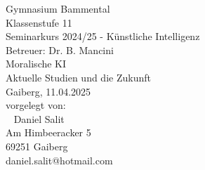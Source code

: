 \documentclass[12pt]{extarticle}
\begin{document}
    \begin{titlepage}
        \begin{center}
            \vspace{3 cm}
            \large
            Gymnasium Bammental \\
            Klassenstufe 11 \\
            Seminarkurs 2024/25 - Künstliche Intelligenz \\
            Betreuer: Dr. B. Mancini \\
            \vfill
            \Huge Moralische KI \\
            \huge Aktuelle Studien und die Zukunft \\
            \vspace{5 cm}
            \large
            Gaiberg, 11.04.2025 \\
            \vspace{2 cm}
            vorgelegt von: \\
            ~\newline
            Daniel Salit \\
            Am Himbeeracker 5 \\
            69251 Gaiberg \\
            daniel.salit@hotmail.com \\
        \end{center}
        \normalsize
    \end{titlepage}

    \setlength{\baselineskip}{0.75cm}

    \tableofcontents

    \clearpage

    

    \clearpage
    
    
    

    

    

    

    \clearpage
    

    
\end{document}
